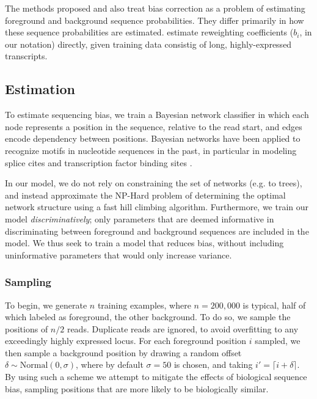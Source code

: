 \documentclass{bioinfo}
\begin{document}
The methods proposed \citet{Hansen2010} and \cite{Roberts2011} also treat bias
correction as a problem of estimating foreground and background sequence
probabilities. They differ primarily in how these sequence probabilities are
estimated. \citet{Li2010} estimate reweighting coefficients ($b_i$, in our
notation) directly, given training data consistig of long, highly-expressed
transcripts.



\subsection{Estimation}

To estimate sequencing bias, we train a Bayesian network classifier in which
each node represents a position in the sequence, relative to the read start, and
edges encode dependency between positions.  Bayesian networks have been applied
to recognize motifs in nucleotide sequences in the past, in particular in
modeling splice cites \citep{Cai2000, Chen2005} and transcription factor binding
sites \citep{Ben-Gal2005, Grau2006, Pudimat2005}. 

In our model, we do not rely on constraining the set of networks (e.g. to
trees), and instead approximate the NP-Hard problem of determining the optimal
network structure using a fast hill climbing algorithm. Furthermore, we
train our model \emph{discriminatively}; only parameters that are deemed
informative in discriminating between foreground and background sequences are
included in the model. We thus seek to train a model that reduces bias, without
including uninformative parameters that would only increase variance.


\subsubsection{Sampling}

To begin, we generate $n$ training examples, where $n = 200,000$ is typical, half of
which labeled as foreground, the other background. To do so, we sample the
positions of $n/2$ reads. Duplicate reads are ignored, to avoid overfitting to
any exceedingly highly expressed locus.  For each foreground position $i$
sampled, we then sample a background position by drawing a random offset $\delta
\sim \text{Normal}( 0, \sigma )$, where by default $\sigma = 50$ is chosen, and
taking $i' = \lceil i + \delta \rceil$. By using such a scheme we attempt to
mitigate the effects of biological sequence bias, sampling positions that are
more likely to be biologically similar.
\end{document}
